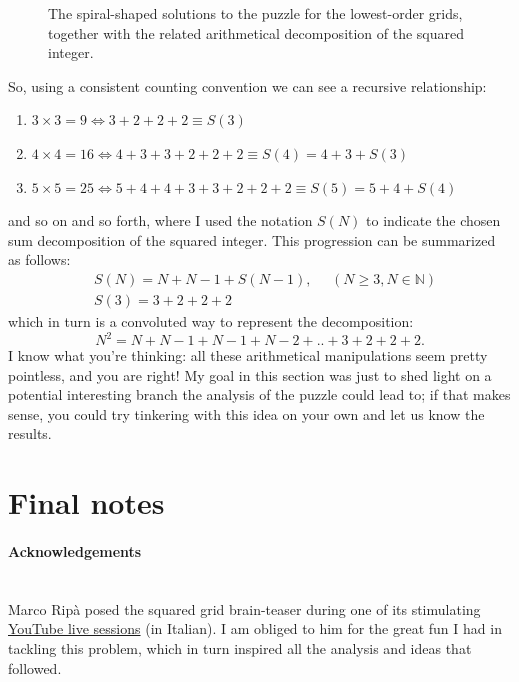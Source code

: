\documentclass[11pt]{article}
\begin{document}
\begin{figure}

\caption{The spiral-shaped solutions to the puzzle for the lowest-order grids, together with the related arithmetical decomposition of the squared integer.}
\label{fig:solution-number-decomposition}
\end{figure}
So, using a consistent counting convention we can see a recursive relationship:\\
\begin{enumerate}
	\item[] %
		$3 \times 3 = 9 \Leftrightarrow 3 + 2 + 2 + 2 \equiv S(3)$
	\item[]
		$4 \times 4 =16 \Leftrightarrow 4 + 3+ 3 + 2 + 2 + 2 \equiv S(4) = 4 + 3 + S(3) $
	\item[]
		$5 \times 5 =25 \Leftrightarrow 5 + 4 + 4 + 3+ 3 + 2 + 2 + 2 \equiv S(5) = 5 + 4 + S(4)$
\end{enumerate}
and so on and so forth, where I used the notation $S(N)$ to indicate the chosen sum decomposition of the squared integer. This progression can be summarized as follows:
\begin{equation}
\begin{aligned}
&S(N) = N + N -1 + S(N - 1), \ \ \ \ \ \  (N \geq 3, N \in \mathbb{N})\\
&S(3) = 3 + 2 + 2 + 2
\end{aligned}
\end{equation}
which in turn is a convoluted way to represent the decomposition:
\begin{equation}
N^2 = N + N - 1 + N - 1 + N - 2 + .. + 3 + 2 + 2 + 2.
\end{equation}
I know what you're thinking: all these arithmetical manipulations seem pretty pointless, and you are right! My goal in this section was just to shed light on a potential interesting branch the analysis of the puzzle could lead to; if that makes sense, you could try tinkering with this idea on your own and let us know the results.

\hypertarget{final-notes}{
	\section{Final notes}
	\label{final-notes}
}

\paragraph{Acknowledgements} \mbox{} \\ %
Marco Ripà posed the squared grid brain-teaser during one of its stimulating \href{https://www.youtube.com/watch?v=rh-ONRXcHok}{YouTube live sessions} (in Italian). I am obliged to him for the great fun I had in tackling this problem, which in turn inspired all the analysis and ideas that followed.
\end{document}

